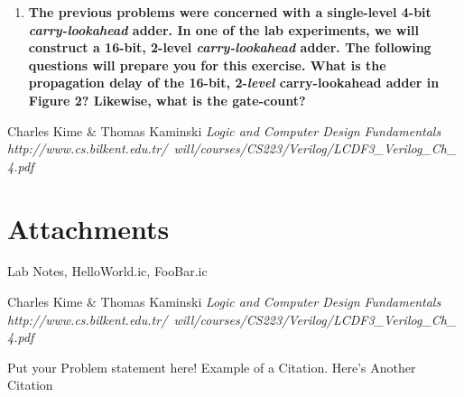 \documentclass[a4paper,12pt]{article}
\begin{document}
\begin{enumerate}
  \item \textbf{The previous problems were concerned with a single-level 4-bit \textit{carry-lookahead} adder. In one of the lab experiments, we will construct a 16-bit, 2-level \textit{carry-lookahead} adder. The following questions will prepare you for this exercise. What is the propagation delay of the 16-bit, 2-\textit{level} carry-lookahead adder in Figure 2? Likewise, what is the gate-count?}

\end{enumerate}

\ifx
\begin{thebibliography}{1}
 Charles Kime \& Thomas Kaminski  \emph{Logic and Computer Design Fundamentals} \\ \hspace{15pt}\textit{http://www.cs.bilkent.edu.tr/~will/courses/CS223/Verilog/LCDF3_Verilog_Ch_4.pdf}
\end{thebibliography}

\section*{Attachments}
Lab Notes, HelloWorld.ic, FooBar.ic

\begin{thebibliography}{9}
 Charles Kime & Thomas Kaminski  \emph{Logic and Computer Design Fundamentals} \textit{http://www.cs.bilkent.edu.tr/~will/courses/CS223/Verilog/LCDF3_Verilog_Ch_4.pdf}
\end{thebibliography}

Put your Problem statement here! Example of a Citation\cite[p.219]{Robotics}. Here's Another Citation\cite{Flueck}
\fi
\end{document}
